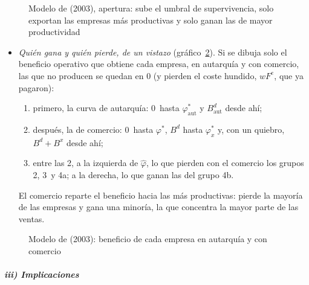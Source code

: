 \documentclass[11pt]{article}
\begin{document}
\begin{figure}[H]
\centering
\caption{Modelo de  (2003), apertura: sube el umbral de supervivencia, solo exportan las empresas más productivas y solo ganan las de mayor productividad}\label{fig:melitz-umbrales}
\end{figure}

\begin{itemize}
\item \emph{Quién gana y quién pierde, de un vistazo} (gráfico~\ref{fig:melitz-ganancias}). Si se dibuja solo el beneficio operativo que obtiene cada empresa, en autarquía y con comercio, las que no producen se quedan en 0 (y pierden el coste hundido, $wF^e$, que ya pagaron):
  \begin{enumerate}
  \item primero, la curva de autarquía: 0~hasta $\varphi^*_{\mathrm{aut}}$ y $B^d_{\mathrm{aut}}$ desde ahí;
  \item después, la de comercio: 0~hasta $\varphi^*$, $B^d$ hasta $\varphi^*_x$ y, con un quiebro, $B^d+B^x$ desde ahí;
  \item entre las 2, a la izquierda de $\hat\varphi$, lo que pierden con el comercio los grupos 2, 3~y 4a; a la derecha, lo que ganan las del grupo 4b.
  \end{enumerate}
  El comercio reparte el beneficio hacia las más productivas: pierde la mayoría de las empresas y gana una minoría, la que concentra la mayor parte de las ventas.
\end{itemize}

\begin{figure}[H]
\centering
\caption{Modelo de  (2003): beneficio de cada empresa en autarquía y con comercio}\label{fig:melitz-ganancias}
\end{figure}

\subparagraph{iii) Implicaciones}
\end{document}
